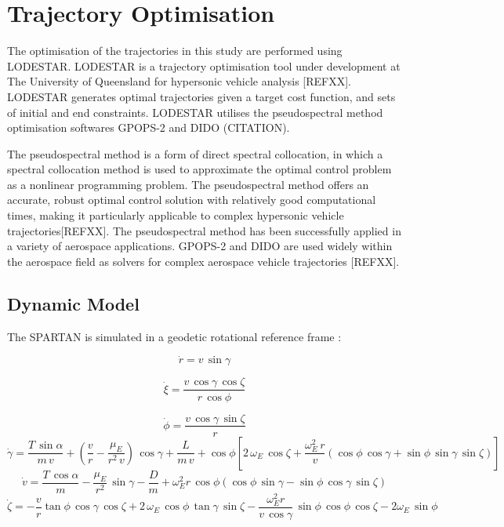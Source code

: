 \documentclass[journal]{new-aiaa} %
\begin{document}
\section{Trajectory Optimisation}\label{sec:opt}
The optimisation of the trajectories in this study are performed using LODESTAR. LODESTAR is a trajectory optimisation tool under development at The University of Queensland for hypersonic vehicle analysis [REFXX]. LODESTAR generates optimal trajectories given a target cost function, and sets of initial and end constraints. LODESTAR utilises the pseudospectral method optimisation softwares GPOPS-2\cite{Patterson2015} and DIDO (CITATION). 

The pseudospectral method is a form of direct spectral collocation, in which a spectral collocation method is used to approximate the optimal control problem as a nonlinear programming problem. The pseudospectral method offers an accurate, robust optimal control solution with relatively good computational times, making it particularly applicable to complex hypersonic vehicle trajectories[REFXX].  The pseudospectral method has been successfully applied in a variety of aerospace applications. GPOPS-2 and DIDO are used widely within the aerospace field as solvers for complex aerospace vehicle trajectories [REFXX].


\subsection{Dynamic Model}

The SPARTAN is simulated in a geodetic rotational reference frame \cite{Josselyn2002a}: 

\begin{equation}
\dot{r} = v \, \sin \gamma
\end{equation}

\begin{equation}
\dot{\xi} = \frac{v \, \cos \gamma \, \cos \zeta}{r \, \cos \phi}
\end{equation}

\begin{equation}
\dot{\phi} = \frac{v\,\cos\gamma\,\sin\zeta}{r}
\end{equation}
\begin{equation}
\dot{\gamma} = \frac{T\,\sin\alpha}{m\,v}+ (\frac{v}{r}-\frac{\mu_E}{r^2 \,v})\,\cos\gamma + \frac{L}{m\,v}
+ \cos\phi[2\,\omega_E\, \cos\zeta + \frac{\omega_E^2\, r}{v}(\cos\phi\,\cos\gamma+\sin\phi\,\sin\gamma\,\sin\zeta)]
\end{equation}
\begin{equation}
\dot{v} = \frac{T\,\cos\alpha}{m}-\frac{\mu_E}{r^2}\,\sin\gamma - \frac{D}{m}
+ \omega_E^2 r\,\cos\phi(\cos\phi\,\sin\gamma-\sin\phi\,\cos\gamma\,\sin\zeta)
\end{equation}
\begin{equation}
\dot{\zeta} = -\frac{v}{r}\tan\phi\,\cos\gamma\,\cos\zeta +2\,\omega_E\,\cos\phi\,\tan\gamma\,\sin\zeta - \frac{\omega_E^2 r}{v\,\cos\gamma}\,\sin\phi \, \cos\phi\,\cos\zeta-2\omega_E\,\sin\phi 
\end{equation}
\end{document}
